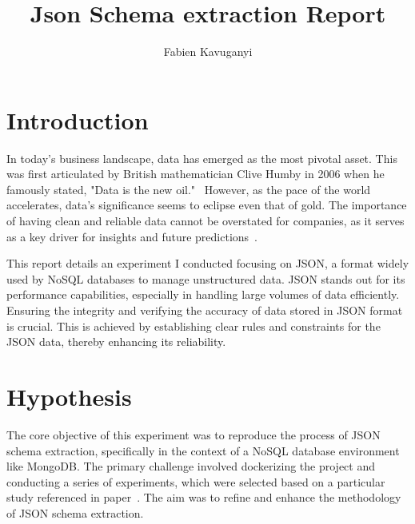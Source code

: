 \documentclass[sigconf, nonacm]{acmart}
\begin{document}
\title{Json Schema extraction Report}

\author{Fabien Kavuganyi}



\maketitle



\section{Introduction}
In today's business landscape, data has emerged as the most pivotal asset. This was first articulated by British mathematician Clive Humby in 2006 when he famously stated, "Data is the new oil."~\cite{js} However, as the pace of the world accelerates, data's significance seems to eclipse even that of gold. The importance of having clean and reliable data cannot be overstated for companies, as it serves as a key driver for insights and future predictions~\cite{8424731}.

This report details an experiment I conducted focusing on JSON, a format widely used by NoSQL databases to manage unstructured data. JSON stands out for its performance capabilities, especially in handling large volumes of data efficiently. Ensuring the integrity and verifying the accuracy of data stored in JSON format is crucial. This is achieved by establishing clear rules and constraints for the JSON data, thereby enhancing its reliability.

\section{Hypothesis}


The core objective of this experiment was to reproduce the process of JSON schema extraction, specifically in the context of a NoSQL database environment like MongoDB. The primary challenge involved dockerizing the project and conducting a series of experiments, which were selected based on a particular study referenced in paper~\cite{8424731}. The aim was to refine and enhance the methodology of JSON schema extraction.
 
\end{document}
